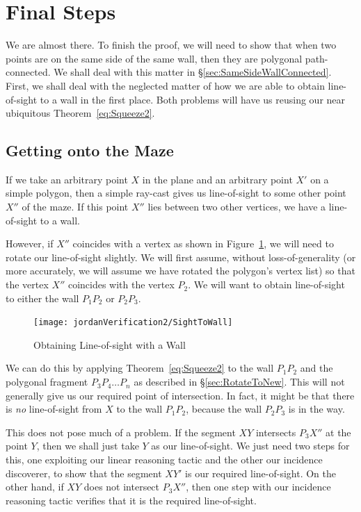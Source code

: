 \section{Final Steps}
We are almost there. To finish the proof, we will need to show that when two points are on the same side of the same wall, then they are polygonal path-connected. We shall deal with this matter in \S\ref{sec:SameSideWallConnected}. First, we shall deal with the neglected matter of how we are able to obtain line-of-sight to a wall in the first place. Both problems will have us reusing our near ubiquitous Theorem~\ref{eq:Squeeze2}.

\subsection{Getting onto the Maze}
If we take an arbitrary point $X$ in the plane and an arbitrary point $X'$ on a simple polygon, then a simple ray-cast gives us line-of-sight to some other point $X''$ of the maze. If this point $X''$ lies between two other vertices, we have a line-of-sight to a wall. 

However, if $X''$ coincides with a vertex as shown in Figure~\ref{fig:SightToWall}, we will need to rotate our line-of-sight slightly. We will first assume, without loss-of-generality (or more accurately, we will assume we have rotated the polygon's vertex list) so that the vertex $X''$ coincides with the vertex $P_2$. We will want to obtain line-of-sight to either the wall $P_1P_2$ or $P_2P_3$.

\begin{figure}
  \centering\texttt{[image: jordanVerification2/SightToWall]}
  \caption{Obtaining Line-of-sight with a Wall}
  \label{fig:SightToWall}
\end{figure}

We can do this by applying Theorem~\ref{eq:Squeeze2} to the wall $P_1P_2$ and the polygonal fragment $P_3P_4\ldots P_n$ as described in \S\ref{sec:RotateToNew}. This will not generally give us our required point of intersection. In fact, it might be that there is \emph{no} line-of-sight from $X$ to the wall $P_1P_2$, because the wall $P_2P_3$ is in the way. 

This does not pose much of a problem. If the segment $XY$ intersects $P_3X''$ at the point $Y$, then we shall just take $Y$ as our line-of-sight. We just need two steps for this, one exploiting our linear reasoning tactic and the other our incidence discoverer, to show that the segment $XY'$ is our required line-of-sight. On the other hand, if $XY$ does not intersect $P_3X''$, then one step with our incidence reasoning tactic verifies that it is the required line-of-sight. 

